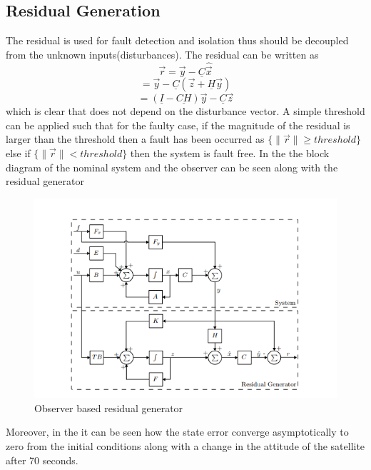 \subsection{Residual Generation}
The residual is used for fault detection and isolation thus should be decoupled from the unknown inputs(disturbances). The residual can be written as
\begin{equation*}
\vec{r} = \vec{y} - \underline C \hat{\vec{x}} 
\label{errordynamics11}
\end{equation*}
\begin{equation*}
= \vec{y} - \underline C (\vec{z} + \underline{H} \vec{y} ) 
\label{errordynamics12}
\end{equation*}
\begin{equation*}
= (\underline I  -\underline{ CH})\vec{y}   -\underline C \vec{z} 
\label{errordynamics13}
\end{equation*}
which is clear that does not depend on the disturbance vector. A simple threshold can be applied such that for the faulty case, if the magnitude of the residual is larger than the threshold then a fault has been occurred as
$\{\lVert \vec{r}\rVert \geq threshold \}$ else if $\{\lVert \vec{r}\rVert < threshold \}$ then the system is fault free. In the  the block diagram of the nominal system and the observer can be seen along with the residual generator
\begin{figure}[H]
	\centering
	\includegraphics[width=0.7\linewidth]{figures/observer}
	\caption{Observer based residual generator}
	\label{fig:residualobs}
\end{figure}
Moreover, in the  it can be seen how the state error converge asymptotically to zero from the initial conditions along with a change in the attitude of the satellite after 70 seconds.
